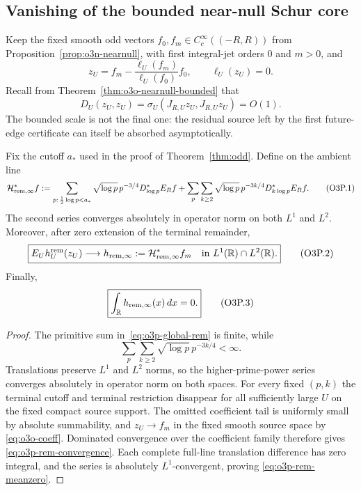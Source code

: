 
\subsection{Vanishing of the bounded near-null Schur core}
\label{subsec:o3p-vanishing-core}

Keep the fixed smooth odd vectors $f_0,f_m\in C_c^\infty((-R,R))$ from
Proposition~\ref{prop:o3n-nearnull}, with first integral-jet orders $0$ and $m>0$, and
\[
 z_U=f_m-\frac{\ell_U(f_m)}{\ell_U(f_0)}f_0,
 \qquad \ell_U(z_U)=0.
\]
Recall from Theorem~\ref{thm:o3o-nearnull-bounded} that
\[
 D_U(z_U,z_U)=\sigma_U(J_{R,U}z_U,J_{R,U}z_U)=O(1).
\]
The bounded scale is not the final one: the residual source left by the first
future-edge certificate can itself be absorbed asymptotically.

\begin{proposition}
\label{prop:o3p-rem-limit}
Fix the cutoff $a_*$ used in the proof of Theorem~\ref{thm:odd}.  Define on the ambient
line
\[
 \mathcal H_{\rm rem,\infty}^*f
 :=
 \sum_{p:\,\frac12\log p<a_*}
 \sqrt{\log p}\,p^{-3/4}D_{\log p}^*E_Rf
 +
 \sum_p\sum_{k\ge2}
 \sqrt{\log p}\,p^{-3k/4}D_{k\log p}^*E_Rf.
\tag{O3P.1}\label{eq:o3p-global-rem}
\]
The second series converges absolutely in operator norm on both $L^1$ and $L^2$.
Moreover, after zero extension of the terminal remainder,
\[
 \boxed{
 E_Uh_U^{\rm rem}(z_U)
 \longrightarrow
 h_{\rm rem,\infty}:=\mathcal H_{\rm rem,\infty}^*f_m
 \quad\text{in }L^1(\mathbb R)\cap L^2(\mathbb R).
 }
\tag{O3P.2}\label{eq:o3p-rem-convergence}
\]
Finally,
\[
 \boxed{
 \int_{\mathbb R}h_{\rm rem,\infty}(x)\,dx=0.
 }
\tag{O3P.3}\label{eq:o3p-rem-meanzero}
\]
\end{proposition}

\begin{proof}
The primitive sum in~\eqref{eq:o3p-global-rem} is finite, while
\[
 \sum_p\sum_{k\ge2}\sqrt{\log p}\,p^{-3k/4}<\infty.
\]
Translations preserve $L^1$ and $L^2$ norms, so the higher-prime-power series converges
absolutely in operator norm on both spaces.  For every fixed $(p,k)$ the terminal cutoff
and terminal restriction disappear for all sufficiently large $U$ on the fixed compact
source support.  The omitted coefficient tail is uniformly small by absolute
summability, and $z_U\to f_m$ in the fixed smooth source space by
\eqref{eq:o3o-coeff}.  Dominated convergence over the coefficient family therefore gives
\eqref{eq:o3p-rem-convergence}.  Each complete full-line translation difference has
zero integral, and the series is absolutely $L^1$-convergent, proving
\eqref{eq:o3p-rem-meanzero}.
\end{proof}


